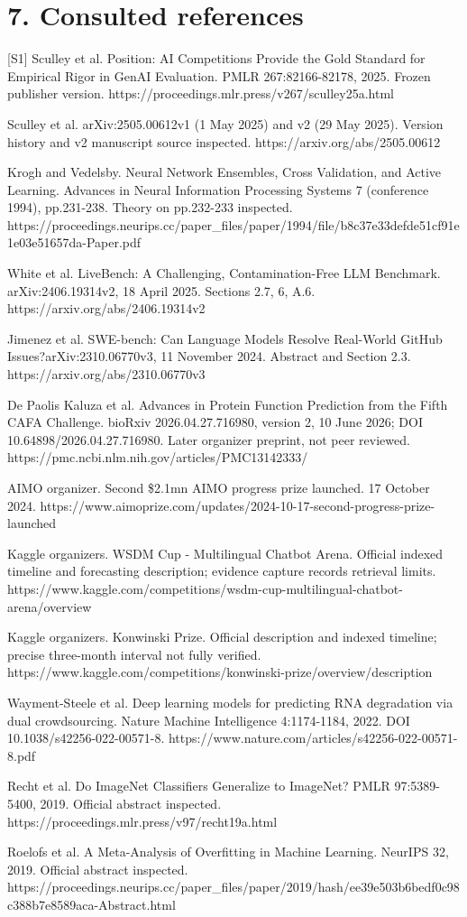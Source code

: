 \documentclass[10pt]{article}
\begin{document}
\section*{7. Consulted references}
[S1] Sculley et al. Position: AI Competitions Provide the Gold Standard for Empirical Rigor in GenAI Evaluation. PMLR 267:82166-82178, 2025. Frozen publisher version. https://proceedings.mlr.press/v267/sculley25a.html\par
Sculley et al. arXiv:2505.00612v1 (1 May 2025) and v2 (29 May 2025). Version history and v2 manuscript source inspected. https://arxiv.org/abs/2505.00612\par
Krogh and Vedelsby. Neural Network Ensembles, Cross Validation, and Active Learning. Advances in Neural Information Processing Systems 7 (conference 1994), pp.231-238. Theory on pp.232-233 inspected. https://proceedings.neurips.cc/paper\_files/paper/1994/file/b8c37e33defde51cf91e1e03e51657da-Paper.pdf\par
White et al. LiveBench: A Challenging, Contamination-Free LLM Benchmark. arXiv:2406.19314v2, 18 April 2025. Sections 2.7, 6, A.6. https://arxiv.org/abs/2406.19314v2\par
Jimenez et al. SWE-bench: Can Language Models Resolve Real-World GitHub Issues?arXiv:2310.06770v3, 11 November 2024. Abstract and Section 2.3. https://arxiv.org/abs/2310.06770v3\par
De Paolis Kaluza et al. Advances in Protein Function Prediction from the Fifth CAFA Challenge. bioRxiv 2026.04.27.716980, version 2, 10 June 2026; DOI 10.64898/2026.04.27.716980. Later organizer preprint, not peer reviewed. https://pmc.ncbi.nlm.nih.gov/articles/PMC13142333/\par
AIMO organizer. Second \$2.1mn AIMO progress prize launched. 17 October 2024. https://www.aimoprize.com/updates/2024-10-17-second-progress-prize-launched\par
Kaggle organizers. WSDM Cup - Multilingual Chatbot Arena. Official indexed timeline and forecasting description; evidence capture records retrieval limits. https://www.kaggle.com/competitions/wsdm-cup-multilingual-chatbot-arena/overview\par
Kaggle organizers. Konwinski Prize. Official description and indexed timeline; precise three-month interval not fully verified. https://www.kaggle.com/competitions/konwinski-prize/overview/description\par
Wayment-Steele et al. Deep learning models for predicting RNA degradation via dual crowdsourcing. Nature Machine Intelligence 4:1174-1184, 2022. DOI 10.1038/s42256-022-00571-8. https://www.nature.com/articles/s42256-022-00571-8.pdf\par
Recht et al. Do ImageNet Classifiers Generalize to ImageNet? PMLR 97:5389-5400, 2019. Official abstract inspected. https://proceedings.mlr.press/v97/recht19a.html\par
Roelofs et al. A Meta-Analysis of Overfitting in Machine Learning. NeurIPS 32, 2019. Official abstract inspected. https://proceedings.neurips.cc/paper\_files/paper/2019/hash/ee39e503b6bedf0c98c388b7e8589aca-Abstract.html\par
\end{document}
